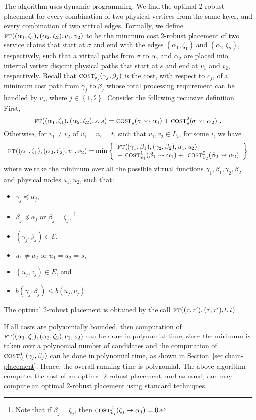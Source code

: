 \documentclass[11pt]{article}
\newcommand{\set}[1]{\left\{ #1 \right\}}
\newcommand{\calE}{\mathcal{E}}
\newcommand{\cost}{\textsc{cost}\xspace}
\newcommand{\ft}{\textsc{ft}\xspace}
\begin{document}
The algorithm uses dynamic programming.  We find the optimal 2-robust
placement for every combination of two physical vertices from the same
layer, and every combination of two virtual edges.
%
Formally, we define $\ft((\alpha_1,\zeta_1), (\alpha_2,\zeta_2), v_1,
v_2)$ to be the minimum cost 2-robust placement of two service chains
that start at $\sigma$ and end with the edges $(\alpha_1,\zeta_1)$ and
$(\alpha_2,\zeta_2)$, respectively, such that a virtual paths from
$\sigma$ to $\alpha_1$ and $\alpha_2$ are placed into internal vertex
disjoint physical paths that start at $s$ and end at $v_1$ and $v_2$,
respectively.
%
Recall that $\cost^j_{v_j}(\gamma_j,\beta_j)$ is the cost, with
respect to $c_j$, of a minimum cost path from $\gamma_j$ to $\beta_j$
whose total processing requirement can be handled by $v_j$, where $j
\in \set{1,2}$.
%
Consider the following recursive definition.  First,
\[
\ft((\alpha_1,\zeta_1),(\alpha_2,\zeta_2),s,s)
= \cost^1_{s}(\sigma \leadsto \alpha_1) +
  \cost^2_{s}(\sigma \leadsto \alpha_2)
~.
\]
Otherwise, for $v_1 \neq v_2$ of $v_1 = v_2 = t$, such that $v_1, v_2
\in L_i$, for some $i$, we have
\[
\ft((\alpha_1,\zeta_1),(\alpha_2,\zeta_2),v_1,v_2)
=
\min\set{
%
\begin{array}{l}
\ft((\gamma_1,\beta_1),(\gamma_2,\beta_2),u_1,u_2) \\ 
+~ \cost^1_{v_1}(\beta_1 \leadsto \alpha_1) 
+~ \cost^2_{v_2}(\beta_2 \leadsto \alpha_2)
\end{array}
}
\]
where we take the minimum over all the possible virtual functions
$\gamma_1, \beta_1, \gamma_2, \beta_2$ and physical nodes $u_1, u_2$,
such that:
\begin{itemize}
  \item $\gamma_j \preceq \alpha_j$,
  \item $\beta_j \preceq \alpha_j$ or $\beta_j = \zeta_j$,%
\footnote{Note that if $\beta_j = \zeta_j$, then
  $\cost^j_{v_j}(\zeta_j \to \alpha_j) = 0$.}
  \item $(\gamma_j,\beta_j) \in \calE$,
  \item $u_1 \neq u_2$ or $u_1 = u_2 = s$,
  \item $(u_j,v_j) \in E$, and
  \item $b(\gamma_j,\beta_j) \leq b(u_j,v_j)$
\end{itemize}
 
The optimal $2$-robust placement is obtained by the call
$\ft((\tau,\tau'),(\tau,\tau'),t,t)$

If all costs are polynomially bounded, then computation of
$\ft((\alpha_1,\zeta_1),(\alpha_2,\zeta_2),v_1,v_2)$ can be done in
polynomial time, since the minimum is taken over a polynomial number
of candidates and the computation of $\cost^j_{v_j}(\gamma_j,\beta_j)$
can be done in polynomial time, as shown in
Section~\ref{sec:chain-placement}.  Hence, the overall running time is
polynomial.
%
The above algorithm computes the cost of an optimal $2$-robust
placement, and as usual, one may compute an optimal $2$-robust
placement using standard techniques.
\end{document}
